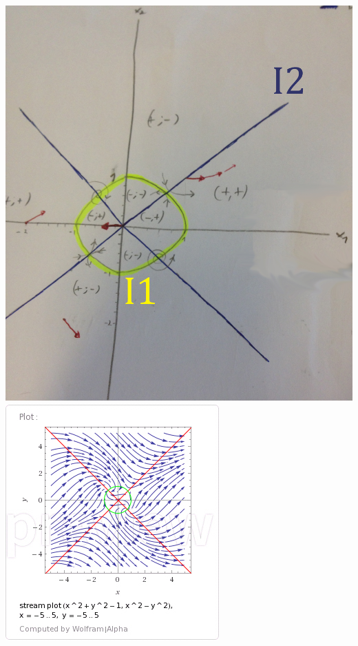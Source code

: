 \documentclass[11pt,a4paper]{report}
\begin{document}
			\includegraphics[width=\textwidth]{"portrait-de-phase"}
			\includegraphics[width=\textwidth]{portrait-de-phase_wolfram}
		
\end{document}
